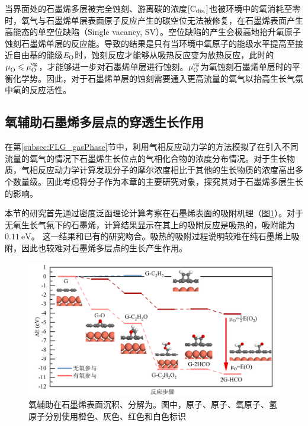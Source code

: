 当界面处的石墨烯多层被完全蚀刻、游离碳的浓度$\rm{\left[C_{dis.}\right]} \it$也被环境中的氧消耗至零时，氧气与石墨烯单层表面原子反应产生的碳空位无法被修复，在石墨烯表面产生高能态的单空位缺陷（Single vacancy, SV）。空位缺陷的产生会极高地抬升氧原子蚀刻石墨烯单层的反应能。导致的结果是只有当环境中氧原子的能级水平提高至接近自由基的能级$\it E_{\rm O} \it$时，蚀刻反应才能够从吸热反应变为放热反应，此时的$\it \mu_{\rm O}^{\rm } \it \leqslant  \it \mu_{\rm O}^{\rm eg} \it  $，才能够进一步对石墨烯单层进行蚀刻。$\it \mu_{\rm O}^{\rm eg} \it$为氧蚀刻石墨烯单层时的平衡化学势。因此，对于石墨烯单层的蚀刻需要通入更高流量的氧气以抬高生长气氛中氧的反应活性。

\subsection{氧辅助石墨烯多层点的穿透生长作用}
\label{subsec:Opene}
在第\ref{subsec:FLG_gasPhase}节中，利用气相反应动力学的方法模拟了在引入不同流量的氧气的情况下石墨烯生长位点的气相化合物的浓度分布情况。对于生长物质，气相反应动力学计算发现分子的摩尔浓度相比于其他的生长物质的浓度高出多个数量级。因此考虑将分子作为本章的主要研究对象，探究其对于石墨烯多层生长的影响。

本节的研究首先通过密度泛函理论计算考察在石墨烯表面的吸附机理（图\ref{fig:FLG_DFT_C2H2toCHO}）。对于无氧生长气氛下的石墨烯，计算结果显示在其上的吸附反应是吸热的，吸附能为$\SI{0.11}{\electronvolt}$。
这一结果和已有的研究吻合。吸热的吸附过程说明较难在纯石墨烯上吸附，因此也较难对石墨烯多层点的生长产生作用。

\begin{figure}[htb]
    \includegraphics{pic/FLG_DFT_C2H2toCHO.png}
    \caption{氧辅助在石墨烯表面沉积、分解为。图中，原子、原子、氧原子、氢原子分别使用橙色、灰色、红色和白色标识}
    \label{fig:FLG_DFT_C2H2toCHO}
\end{figure}

